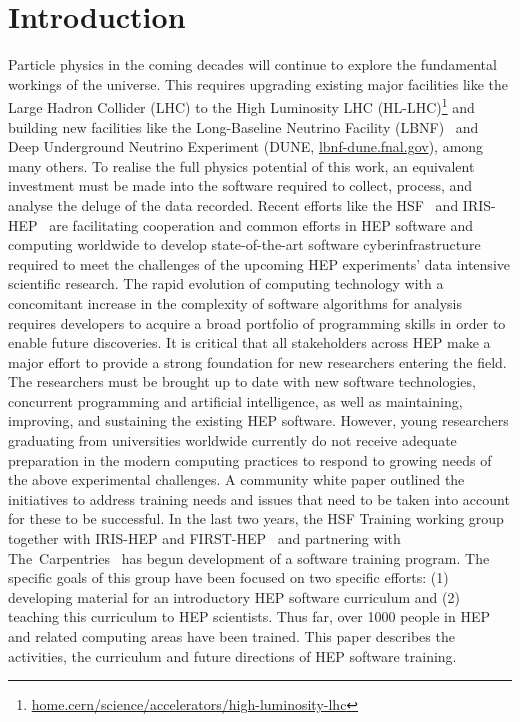 \documentclass[twocolumn]{svjour3}          %
\begin{document}
\section{Introduction}
\label{intro}
Particle physics in the coming decades will continue to explore the fundamental workings of the universe. This requires  upgrading existing major facilities like the Large Hadron Collider (LHC) to the High Luminosity LHC (HL-LHC)\footnote{\href{https://home.cern/science/accelerators/high-luminosity-lhc}{home.cern/science/accelerators/high-luminosity-lhc}} and building new facilities like the Long-Baseline Neutrino Facility (LBNF)~\cite{papadimitriou2017design} and Deep Underground Neutrino Experiment (DUNE,  \href{https://lbnf-dune.fnal.gov/}{lbnf-dune.fnal.gov}), among many others.  To realise the full physics potential of this work, an equivalent investment must be made into the software required to collect, process, and analyse the deluge of the data recorded. Recent efforts like the HSF~\cite{HSF-homepage} and IRIS-HEP~\cite{iris-hep} are facilitating cooperation and common efforts in HEP software and computing worldwide to develop state-of-the-art software cyberinfrastructure required to meet the challenges of the upcoming HEP experiments'  data intensive scientific research. The rapid evolution of computing technology with a  concomitant increase in the complexity of software algorithms for analysis requires developers to acquire a broad portfolio of programming skills in order to enable future discoveries. It is critical that all stakeholders across HEP make a major effort to provide a strong foundation for new researchers entering the field. The researchers must be brought up to date with new software technologies, concurrent programming and artificial intelligence, as well as maintaining, improving, and sustaining the existing HEP software. However, young researchers graduating from universities worldwide currently do not receive adequate preparation in the modern computing practices to respond to growing needs of the above experimental challenges. A community white paper \cite{hsfwptraining} outlined the initiatives to address training needs and issues that need to be taken into account for these to be successful. In the last two years, the HSF Training working group together with IRIS-HEP and FIRST-HEP~\cite{first-hep} and partnering with The~Carpentries~\cite{carpentries} has begun development of a software training program. The specific goals of this group have been focused on two specific efforts: (1) developing material for an introductory HEP software curriculum and (2) teaching this curriculum to HEP scientists. Thus far, over 1000 people in HEP and related computing areas have been trained. This paper describes the activities, the curriculum and future directions of HEP software training.
%
\end{document}
